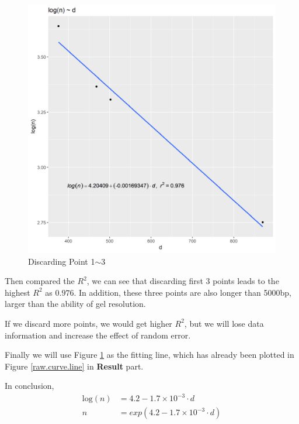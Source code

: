 \documentclass{article}
\begin{document}
\begin{figure}[H]
\begin{minipage}[t]{0.5\textwidth}
                    \centering
                    \includegraphics[width = 0.8\linewidth]{../Data/discard_4.png}
                    \caption{Discarding Point 1$\sim$3}
                    \label{dis.3}
                \end{minipage}
            \end{figure}

            Then compared the $R^2$, we can see that discarding first 3 points leads to the highest $R^2$ as $0.976$. In addition, these three points are also longer than 5000bp, larger than the ability of gel resolution. 

            If we discard more points, we would get higher $R^2$, but we will lose data information and increase the effect of random error.

            Finally we will use Figure \ref{dis.3} as the fitting line, which has already been plotted in Figure \ref{raw.curve.line} in \textbf{Result} part.

            In conclusion,
            $$
            \begin{aligned}
                \text{log}(n) &= 4.2 - 1.7\times 10 ^ {-3} \cdot d\\
                n &= exp(4.2 - 1.7 \times 10 ^ {-3} \cdot d)
            \end{aligned}
            $$
\end{document}
